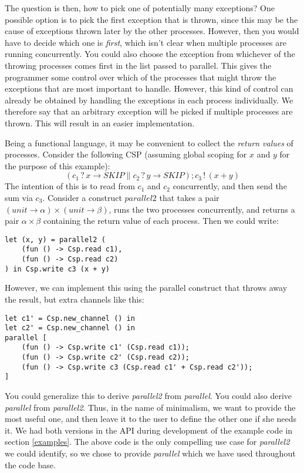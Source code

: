 \documentclass[a4paper,12pt]{article}
\begin{document}
The question is then, how to pick
one of potentially many exceptions? One possible option is to pick the first
exception that is thrown, since this may be the cause of exceptions thrown later
by the other processes. However, then you would have to decide which one is
{\it first}, which isn't clear when multiple processes are running concurrently.
You could also choose the exception from whichever of the throwing processes
comes first in the list passed to parallel. This gives the programmer some
control over which of the processes that might throw the exceptions that are
most important to handle. However, this kind of control can already be obtained
by handling the exceptions in each process individually. We therefore say that
an arbitrary exception will be picked if multiple processes are thrown. This
will result in an easier implementation.

Being a functional language, it may be convenient to collect the \emph{return
values} of processes. Consider the following CSP (assuming global scoping for
$x$ and $y$ for the purpose of this example):
\[(c_1\,?\,x \to SKIP \parallel c_2\,?\,y \to SKIP); c_3\,!\,(x + y)\]
The intention of this is to read from $c_1$ and $c_2$ concurrently, and then
send the sum via $c_3$. Consider a construct $parallel2$ that takes a pair 
$(unit \to \alpha) \times (unit \to \beta)$, runs the two processes
concurrently, and returns a pair $\alpha \times \beta$ containing the return
value of each process. Then we could write:

\begin{verbatim}
let (x, y) = parallel2 (
    (fun () -> Csp.read c1), 
    (fun () -> Csp.read c2)
) in Csp.write c3 (x + y)
\end{verbatim}

However, we can implement this using the parallel construct that throws away
the result, but extra channels like this:

\begin{verbatim}
let c1' = Csp.new_channel () in
let c2' = Csp.new_channel () in
parallel [
    (fun () -> Csp.write c1' (Csp.read c1));
    (fun () -> Csp.write c2' (Csp.read c2));
    (fun () -> Csp.write c3 (Csp.read c1' + Csp.read c2'));
]
\end{verbatim}

You could generalize this to derive \emph{parallel2} from \emph{parallel}. You
could also derive \emph{parallel} from \emph{parallel2}. Thus, in the name of
minimalism, we want to provide the most useful one, and then leave it to the
user to define the other one if she needs it. We had both versions in the API
during development of the example code in section \ref{examples}. The above code
is the only compelling use case for \emph{parallel2} we could identify, so we
chose to provide \emph{parallel} which we have used throughout the code base.
\end{document}
